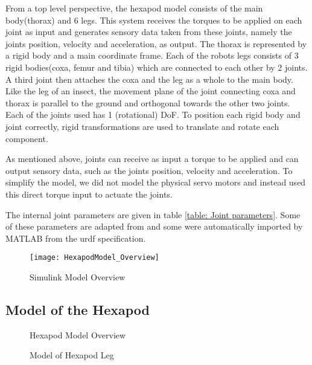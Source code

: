 From a top level perspective, the hexapod model consists of the main body(thorax) and 6 legs.
This system receives the torques to be applied on each joint as input and generates sensory data taken from these joints, namely the joints position, velocity and acceleration, as output.
The  thorax is represented by a rigid body and a main coordinate frame.
Each of the robots legs consists of 3 rigid bodies(coxa, femur and tibia) which are connected to each other by 2 joints.
A third joint then attaches the coxa and the leg as a whole to the main body.
Like the leg of an insect, the movement plane of the joint connecting coxa and thorax is parallel to the ground and orthogonal towards the other two joints.
Each of the joints used has 1 (rotational) DoF.
To position each rigid body and joint correctly, rigid transformations are used to translate and rotate each component.

As mentioned above, joints can receive as input a torque to be applied and can output sensory data, such as the joints position, velocity and acceleration. 
To simplify the model, we did not model the physical servo motors and instead used this direct torque input to actuate the joints.

The internal joint parameters are given in table \ref{table: Joint parameters}.
Some of these parameters are adapted from \parencite{FIND AUTHOR} and some were automatically imported by MATLAB from the urdf specification.


\begin{figure}
	\centerline{\texttt{[image: HexapodModel\_Overview]}}
	\caption{Simulink Model Overview}
	\label{figure: Simulink Model Overview}
\end{figure}

\subsection{Model of the Hexapod}

\begin{figure}
	\centerline{}
	\caption{Hexapod Model Overview}
	\label{figure: Hexapod Model Overview}
\end{figure}

\begin{figure}
	\centerline{}
	\caption{Model of Hexapod Leg}
	\label{figure: Hexapod Leg}
\end{figure}



